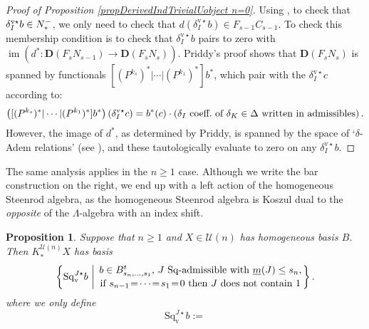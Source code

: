 \documentclass[11pt]{amsart} \renewcommand{\baselinestretch}{1.2}
\theoremstyle{plain}
\newtheorem{prop}[thm]{Proposition}
\numberwithin{equation}{section} %
\theoremstyle{plain}
\newtheorem{prop}[thm]{Proposition}
\numberwithin{equation}{chapter} %
\DeclareMathOperator{\im}{im}
\renewcommand{\to}{\longrightarrow}
\newcommand{\calU}{\mathcal{U}}
\newcommand{\deltaalg}{\Delta} %
\newcommand{\minDimSq}{\underline{m}}
\newcommand{\produces}[3]{#3:#1\sim #2}
\renewcommand{\produces}[3]{#1\rightarrow_{#3} #2}%
\renewcommand{\produces}[3]{#1\overset{\smash{#3}}{\rightarrow} #2}%
\newcommand{\Nop}{N^{\smash{-}}}
\newcommand{\Sq}{\mathrm{Sq}}
\newcommand{\dver}{_\mathrm{v}}
\newcommand{\Sqvstar}[1]{\mathrm{Sq}\dver^{#1\star}}
\newcommand{\deltavstar}{\delta^{\mathrm{v}\star}}
\newcommand{\dual}{\mathbf{D}}
\begin{document}
\begin{Koszul complexes}
\begin{proof}[Proof of Proposition \ref{propDerivedIndTrivialUobject n=0}]
Using \cite[Lemma 3.2]{PriddyKoszul.pdf}, to check that $\deltavstar_Ib\in\Nop_*$, we only need to check that $d(\deltavstar_Ib)\in F_{s-1}C_{s-1}$.
To check this membership condition is to check that $\deltavstar_Ib$ pairs to zero with $\im(d^*:\dual(F_sN_{s-1})\to\dual(F_sN_s))$. Priddy's proof shows that $\dual(F_sN_s)$ is spanned by functionals $[(P^{k_s})^*|\cdots |(P^{k_1})^*]b^*$, which pair with the $\deltavstar_Ic$ according to: %
\[\left([(P^{k_s})^*|\cdots |(P^{k_1})^*]b^*\right)\left(\deltavstar_Ic\right)= b^*(c)\cdot\left(\textup{$\delta_I$ coeff.\ of $\delta_K\in\deltaalg$ written in admissibles}\right).\]
However, the image of $d^*$, as determined by Priddy, is spanned by the space of `$\delta$-Adem relations' (see \cite[Theorem 2.5 and proof]{PriddyKoszul.pdf}), and these tautologically evaluate to zero on any $\deltavstar_Ib$.
\end{proof}
The same analysis applies in the $n\geq1$ case. Although we write the bar construction on the right, we end up with a left action of the homogeneous Steenrod algebra, as the homogeneous Steenrod algebra is Koszul dual to the \emph{opposite} of the $\Lambda$-algebra with an index shift.
\begin{prop}
\label{propDerivedIndTrivialUobject n at least 1}
Suppose that $n\geq1$ and $X\in\calU(n)$ has homogeneous basis $B$. Then $K_*^{\calU(n)}X$ has basis
\[\left\{\Sqvstar{J}b\ \middle|\ \genfrac{}{}{0pt}{}{b\in B_{s_{n},\ldots,s_1}^t\textup{, $J$ $\Sq$-admissible with }\minDimSq(J)\leq s_n,}{\textup{if }s_{n-1}\!=\!\cdots\!=\!s_1\!=\!0\textup{ then $J$ does not contain 1}}\right\}.\]
where we only define
\[\Sqvstar{J}b:=
\]
\end{prop}
\end{Koszul complexes}
\end{document}
